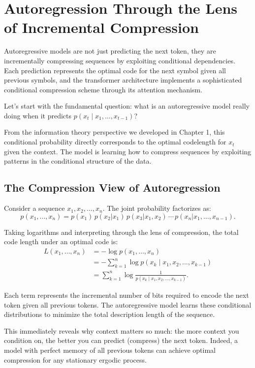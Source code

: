 \section{Autoregression Through the Lens of Incremental Compression}

\vspace{1.5em}
\begin{keyinsight}
Autoregressive models are not just predicting the next token, they are incrementally compressing sequences by exploiting conditional dependencies. Each prediction represents the optimal code for the next symbol given all previous symbols, and the transformer architecture implements a sophisticated conditional compression scheme through its attention mechanism.
\end{keyinsight}

\vspace{1.5em}


Let's start with the fundamental question: what is an autoregressive model really doing when it predicts $p(x_t \mid x_1, \ldots, x_{t-1})$?

From the information theory perspective we developed in Chapter 1, this conditional probability directly corresponds to the optimal codelength for $x_t$ given the context. The model is learning how to compress sequences by exploiting patterns in the conditional structure of the data.

\subsection{The Compression View of Autoregression}

Consider a sequence $x_1, x_2, \ldots, x_n$. The joint probability factorizes as:
\begin{equation}
p(x_1, \ldots, x_n) = p(x_1) \, p(x_2|x_1) \, p(x_3|x_1, x_2) \, \cdots \, p(x_n|x_1, \ldots, x_{n-1}).
\end{equation}

Taking logarithms and interpreting through the lens of compression, the total code length under an optimal code is:
\begin{align}
    L(x_1, \ldots, x_n)
    &= -\log p(x_1, \ldots, x_n) \\
    &= -\sum_{k=1}^n \log p(x_k \mid x_1, x_2, \ldots, x_{k-1}) \\
    &= \sum_{k=1}^n \log \frac{1}{p(x_k \mid x_1, x_2, \ldots, x_{k-1})}.
\end{align}

Each term represents the incremental number of bits required to encode the next token given all previous tokens. The autoregressive model learns these conditional distributions to minimize the total description length of the sequence.

This immediately reveals why context matters so much: the more context you condition on, the better you can predict (compress) the next token. Indeed, a model with perfect memory of all previous tokens can achieve optimal compression for any stationary ergodic process.

